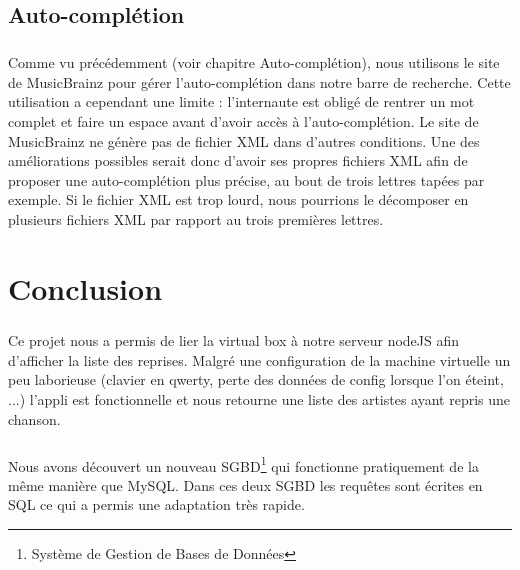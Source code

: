 \documentclass{report}
\begin{document}
	\section*{Auto-complétion}
	\paragraph{}{
		Comme vu précédemment (voir chapitre Auto-complétion), nous utilisons le site de MusicBrainz pour gérer l'auto-complétion dans notre barre de recherche. Cette utilisation a cependant une limite : l'internaute est obligé de rentrer un mot complet et faire un espace avant d'avoir accès à l'auto-complétion. Le site de MusicBrainz ne génère pas de fichier XML dans d'autres conditions. Une des améliorations possibles serait donc d'avoir ses propres fichiers XML afin de proposer une auto-complétion plus précise, au bout de trois lettres tapées par exemple. Si le fichier XML est trop lourd, nous pourrions le décomposer en plusieurs fichiers XML par rapport au trois premières lettres.
	}
%
\chapter*{Conclusion}
\thispagestyle{fancy}
	\paragraph{}{
		Ce projet nous a permis de lier la virtual box à notre serveur nodeJS afin d'afficher la liste des reprises. Malgré une configuration de la machine virtuelle un peu laborieuse (clavier en qwerty, perte des données de config lorsque l'on éteint, ...) l'appli est fonctionnelle et nous retourne une liste des artistes ayant repris une chanson.

	}

	\paragraph{}{
		Nous avons découvert un nouveau SGBD\footnote{Système de Gestion de Bases de Données} qui fonctionne pratiquement de la même manière que MySQL. Dans ces deux SGBD les requêtes sont écrites en SQL ce qui a permis une adaptation très rapide.
	}
\end{document}
